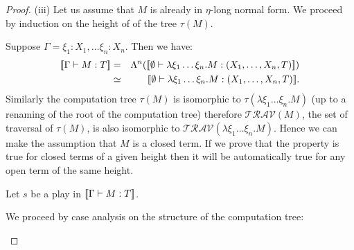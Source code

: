 \begin{proof}
(iii) Let us assume that $M$ is already in $\eta$-long normal form.
We proceed by induction on the height of of the tree $\tau(M)$.

Suppose $\Gamma = \xi_1:X_1,\ldots \xi_n:X_n$.
Then we have:
\begin{eqnarray*}
{[\![\Gamma \vdash M:T ]\!]} &=& \Lambda^n( {[\![ \emptyset \vdash \lambda \xi_1\ldots \xi_n . M: (X_1,\ldots,X_n,T)  ]\!]} ) \\
        &\simeq& {[\![ \emptyset \vdash \lambda \xi_1\ldots \xi_n . M: (X_1,\ldots,X_n,T)  ]\!]}.
\end{eqnarray*}
Similarly the computation tree $\tau(M)$ is isomorphic to
$\tau(\lambda \xi_1\ldots \xi_n . M)$ (up to a renaming of the root of the computation tree) therefore
$\mathcal{TRAV}(M)$, the set of traversal of $\tau(M)$, is also isomorphic to $\mathcal{TRAV}(\lambda \xi_1\ldots \xi_n . M)$.
Hence we can make the assumption that $M$ is a closed term. If we prove that the property is true for
closed terms of a given height then it will be automatically true for any open term of the same height.

Let $s$ be a play in ${[\![ \Gamma \vdash M:T ]\!]}$.

We proceed by case analysis on the structure of the computation tree:
\begin{itemize}

%
%
%



\end{itemize}
\end{proof}
